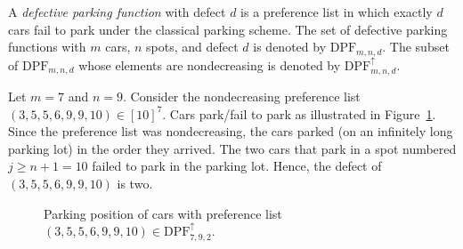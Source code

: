 \documentclass[11pt,reqno]{BICA}
\theoremstyle{definition}
\newcommand{\NDDPF}{\mathrm{DPF}^\uparrow}
\newcommand{\DPF}{\mathrm{DPF}}
\begin{document}
\begin{definition}\label{def:nonneg defect}
    A \textit{defective parking function} with defect $d$ is a  preference list in which exactly $d$ cars fail to park under the classical parking scheme. 
    The set of defective parking functions with $m$ cars, $n$ spots, and defect $d$ is denoted by $\DPF_{m, n,d}$. The subset of $\DPF_{m,n,d}$ whose elements are nondecreasing is denoted by $\NDDPF_{m,n,d}$.
\end{definition}




\begin{example}\label{ex:defective}
 Let $m=7$ and $n=9$. Consider the nondecreasing preference list $(3,5,5,6,9,9,10)\in[10]^7$. Cars park/fail to park as illustrated in Figure~\ref{fig:example1}. Since the preference list was nondecreasing, the cars parked (on an infinitely long parking lot) in the order they arrived. 
The two cars that park in a spot numbered $j \geq n+1 = 10$ failed to park in the parking lot.  Hence, the defect of $(3,5,5,6,9,9,10)$ is two. 
\begin{figure}[!ht]
    \centering
    \caption{Parking position of cars with preference list $(3,5,5,6,9,9,10)\in\NDDPF_{7,9,2}$.
}
    \label{fig:example1}
\end{figure}
\end{example}
\end{document}
